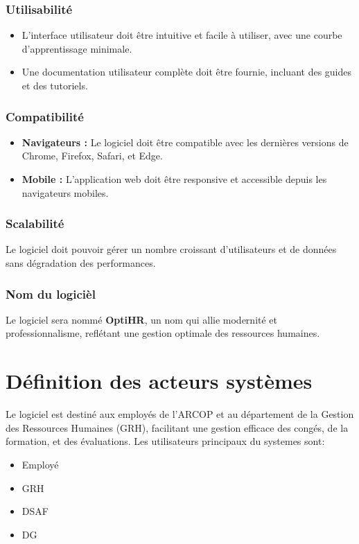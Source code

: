 \subsubsection{Utilisabilité}
\begin{itemize}
    \item L'interface utilisateur doit être intuitive et facile à utiliser, avec une courbe d'apprentissage minimale.
    \item Une documentation utilisateur complète doit être fournie, incluant des guides et des tutoriels.
\end{itemize}

\subsubsection{Compatibilité}
\begin{itemize}
    \item \textbf{Navigateurs :} Le logiciel doit être compatible avec les dernières versions de Chrome, Firefox, Safari, et Edge.
    \item \textbf{Mobile :} L'application web doit être responsive et accessible depuis les navigateurs mobiles.
\end{itemize}

\subsubsection{Scalabilité}
Le logiciel doit pouvoir gérer un nombre croissant d'utilisateurs et de données sans dégradation des performances.


\subsubsection{Nom du logicièl}
Le logiciel sera nommé \textbf{OptiHR}, un nom qui allie modernité et professionnalisme, reflétant une gestion
optimale des ressources humaines.


\section{Définition des acteurs systèmes}
Le logiciel est destiné aux employés de l’ARCOP et au département de la Gestion des Ressources Humaines (GRH), facilitant une gestion efficace des congés, de la formation, et des évaluations.
Les utilisateurs principaux du systemes sont:
\begin{itemize}
    \item Employé 
    \item GRH 
    \item DSAF 
    \item DG 
\end{itemize}
